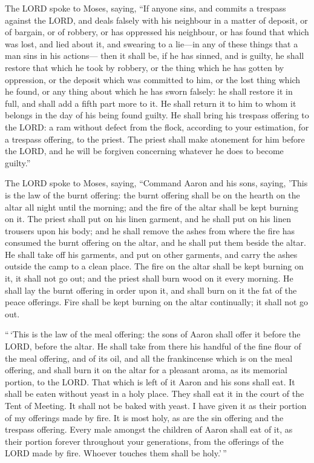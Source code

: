  The LORD spoke to Moses, saying,  ``If
anyone sins, and commits a trespass against the LORD, and deals falsely
with his neighbour in a matter of deposit, or of bargain, or of robbery,
or has oppressed his neighbour,  or has found that which
was lost, and lied about it, and swearing to a lie---in any of these
things that a man sins in his actions---  then it shall
be, if he has sinned, and is guilty, he shall restore that which he took
by robbery, or the thing which he has gotten by oppression, or the
deposit which was committed to him, or the lost thing which he found,
 or any thing about which he has sworn falsely: he shall
restore it in full, and shall add a fifth part more to it. He shall
return it to him to whom it belongs in the day of his being found
guilty.  He shall bring his trespass offering to the LORD:
a ram without defect from the flock, according to your estimation, for a
trespass offering, to the priest.  The priest shall make
atonement for him before the LORD, and he will be forgiven concerning
whatever he does to become guilty.''

 The LORD spoke to Moses, saying,  ``Command
Aaron and his sons, saying, 'This is the law of the burnt offering: the
burnt offering shall be on the hearth on the altar all night until the
morning; and the fire of the altar shall be kept burning on it.
 The priest shall put on his linen garment, and he shall
put on his linen trousers upon his body; and he shall remove the ashes
from where the fire has consumed the burnt offering on the altar, and he
shall put them beside the altar.  He shall take off his
garments, and put on other garments, and carry the ashes outside the
camp to a clean place.  The fire on the altar shall be
kept burning on it, it shall not go out; and the priest shall burn wood
on it every morning. He shall lay the burnt offering in order upon it,
and shall burn on it the fat of the peace offerings. 
Fire shall be kept burning on the altar continually; it shall not go
out.

 ``\,`This is the law of the meal offering: the sons of
Aaron shall offer it before the LORD, before the altar. 
He shall take from there his handful of the fine flour of the meal
offering, and of its oil, and all the frankincense which is on the meal
offering, and shall burn it on the altar for a pleasant aroma, as its
memorial portion, to the LORD.  That which is left of it
Aaron and his sons shall eat. It shall be eaten without yeast in a holy
place. They shall eat it in the court of the Tent of Meeting.
 It shall not be baked with yeast. I have given it as
their portion of my offerings made by fire. It is most holy, as are the
sin offering and the trespass offering.  Every male
amongst the children of Aaron shall eat of it, as their portion forever
throughout your generations, from the offerings of the LORD made by
fire. Whoever touches them shall be holy.'\,''

